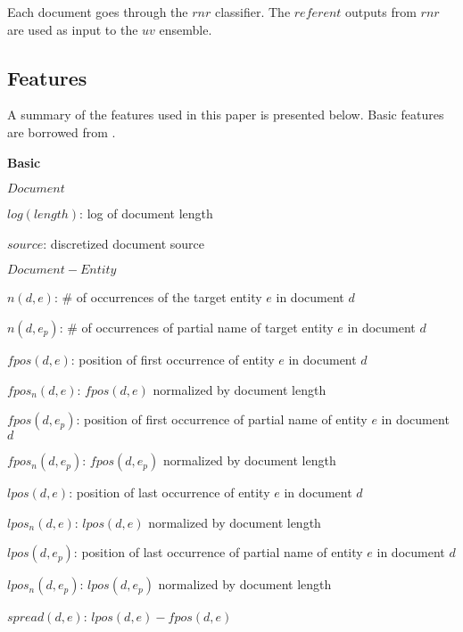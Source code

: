 \documentclass{article}
\begin{document}
Each document goes through the $rnr$ classifier. The $referent$ outputs from $rnr$ are used as input to the $uv$ ensemble.

\subsection{Features}
\label{feat}

A summary of the features used in this paper is presented below. Basic features are borrowed from \cite{jingang13}.

\begin{itemize*}
  \item \textbf{Basic}
    \begin{itemize*}
      \item $Document$
        \begin{itemize*}
            \item $log(length)$: log of document length
            \item $source$: discretized document source
        \end{itemize*}
      \item $Document-Entity$
        \begin{itemize*}
            \item $n(d,e)$: \# of occurrences of the target entity $e$ in document $d$
            \item $n(d,e_p)$: \# of occurrences of partial name of target entity $e$ in document $d$
            \item $fpos(d,e)$: position of first occurrence of entity $e$ in document $d$
            \item $fpos_n(d,e)$: $fpos(d,e)$ normalized by document length
            \item $fpos(d,e_p)$: position of first occurrence of partial name of entity $e$ in document $d$
            \item $fpos_n(d,e_p)$: $fpos(d,e_p)$ normalized by document length
            \item $lpos(d,e)$: position of last occurrence of entity $e$ in document $d$
            \item $lpos_n(d,e)$: $lpos(d,e)$ normalized by document length
            \item $lpos(d,e_p)$: position of last occurrence of partial name of entity $e$ in document $d$
            \item $lpos_n(d,e_p)$: $lpos(d,e_p)$ normalized by document length
            \item $spread(d,e)$: $lpos(d,e) - fpos(d,e)$

\end{itemize*}
\end{itemize*}
\end{itemize*}
\end{document}
